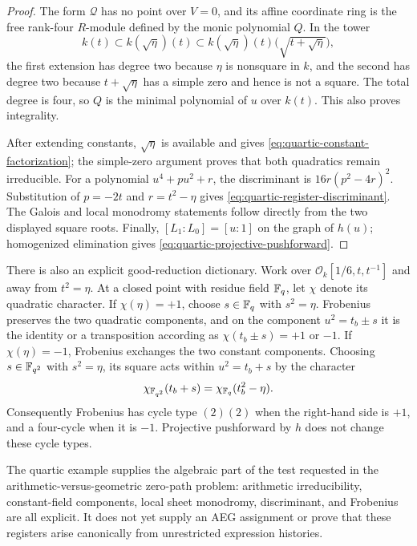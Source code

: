 \begin{proof}
The form \(\mathcal Q\) has no point over \(V=0\), and its affine coordinate
ring is the free rank-four \(R\)-module defined by the monic polynomial \(Q\).
In the tower
\[
 k(t)\subset k(\sqrt\eta)(t)
 \subset k(\sqrt\eta)(t)\bigl(\sqrt{t+\sqrt\eta}\bigr),
\]
the first extension has degree two because \(\eta\) is nonsquare in \(k\), and
the second has degree two because \(t+\sqrt\eta\) has a simple zero and hence is
not a square.  The total degree is four, so \(Q\) is the minimal polynomial of
\(u\) over \(k(t)\).  This also proves integrality.

After extending constants, \(\sqrt\eta\) is available and gives
\eqref{eq:quartic-constant-factorization}; the simple-zero argument proves that
both quadratics remain irreducible.  For a polynomial \(u^4+pu^2+r\), the
discriminant is \(16r(p^2-4r)^2\).  Substitution of
\(p=-2t\) and \(r=t^2-\eta\) gives
\eqref{eq:quartic-register-discriminant}.  The Galois and local monodromy
statements follow directly from the two displayed square roots.  Finally,
\([L_1:L_0]=[u:1]\) on the graph of \(h(u)\); homogenized elimination gives
\eqref{eq:quartic-projective-pushforward}.
\end{proof}

There is also an explicit good-reduction dictionary.  Work over
\(\mathcal O_k[1/6,t,t^{-1}]\) and away from \(t^2=\eta\).  At a closed point
with residue field \(\mathbb{F}_q\), let \(\chi\) denote its quadratic character.
If \(\chi(\eta)=+1\), choose \(s\in\mathbb{F}_q\) with \(s^2=\eta\).  Frobenius
preserves the two quadratic components, and on the component
\(u^2=t_b\pm s\) it is the identity or a transposition according as
\(\chi(t_b\pm s)=+1\) or \(-1\).  If \(\chi(\eta)=-1\), Frobenius exchanges
the two constant components.  Choosing \(s\in\mathbb{F}_{q^2}\) with \(s^2=\eta\),
its square acts within \(u^2=t_b+s\) by the character
\begin{equation}
 \chi_{\mathbb{F}_{q^2}}(t_b+s)=\chi_{\mathbb{F}_q}(t_b^2-\eta).
 \label{eq:quartic-frobenius-inner-character}
\end{equation}
Consequently Frobenius has cycle type \((2)(2)\) when the right-hand side is
\(+1\), and a four-cycle when it is \(-1\).  Projective pushforward by \(h\)
does not change these cycle types.

The quartic example supplies the algebraic part of the test requested in the
arithmetic-versus-geometric zero-path problem: arithmetic irreducibility,
constant-field components, local sheet monodromy, discriminant, and Frobenius
are all explicit.  It does not yet supply an AEG assignment or prove that these
registers arise canonically from unrestricted expression histories.

